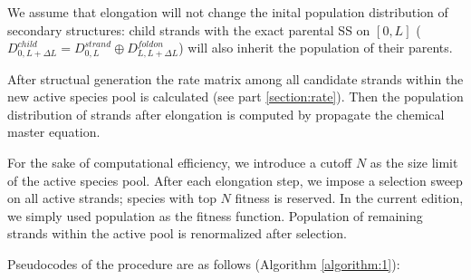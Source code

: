 \documentclass[11pt, a4paper]{article}
\begin{document}
We assume that elongation will not change the inital population distribution
of secondary structures: child strands with the exact parental SS on $[0, L]$ ($D^{child}_{0, L+\Delta L} = D^{strand}_{0, L} \oplus D^{foldon}_{L, L+\Delta L}$) will also inherit the population of their parents.

After structual generation the rate matrix among all candidate strands within the new active species pool is calculated (see part \ref{section:rate}). Then the population
distribution of strands after elongation is computed by propagate the chemical master equation.

For the sake of computational efficiency, we introduce a cutoff $N $ as the size limit of the active species pool. After each elongation step, we impose a selection sweep on all active
strands; species with top $N $ fitness is reserved. In the current edition, we simply used population as the fitness function. Population of remaining strands within
the active pool is renormalized after selection.

Pseudocodes of the procedure are as follows (Algorithm \ref{algorithm:1}):
\end{document}
